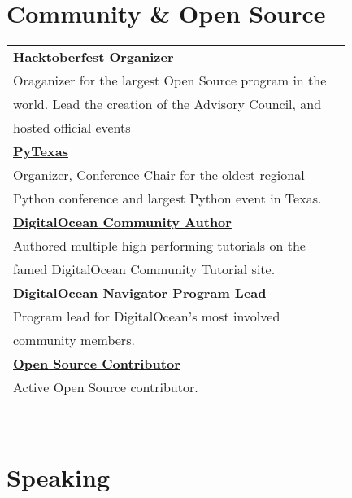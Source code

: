 \documentclass[10pt]{article} %
\newcommand\tab[1][1cm]{\hspace*{#1}}
\begin{document}
\begin{minipage}[t]{0.44\textwidth}
\section{Community \& Open Source}

\begin{tabular}{ll}
\textbf{\href{https://hacktoberfest.digitalocean.com/}{Hacktoberfest Organizer}}\\
\tab Oraganizer for the largest Open Source program in the  \\
\tab world. Lead the creation of the Advisory Council, and  \\
\tab hosted official events \\

\textbf{\href{https://pytexas.org}{PyTexas}}\\
\tab Organizer, Conference Chair for the oldest regional   \\
\tab Python conference and largest Python event in Texas. \\

\textbf{\href{https://www.digitalocean.com/community/users/masonegger?subtype=tutorial}{DigitalOcean Community Author}}\\
\tab Authored multiple high performing tutorials on the  \\
\tab famed DigitalOcean Community Tutorial site. \\

\textbf{\href{https://www.digitalocean.com/community/pages/digitalocean-navigators}{DigitalOcean Navigator Program Lead}}\\
\tab Program lead for DigitalOcean's most involved \\
\tab community members. \\

\textbf{\href{https://github.com/masonegger}{Open Source Contributor}}\\
\tab Active Open Source contributor. \\

\end{tabular}\\

\section{Speaking} 


\end{minipage}
\end{document}

